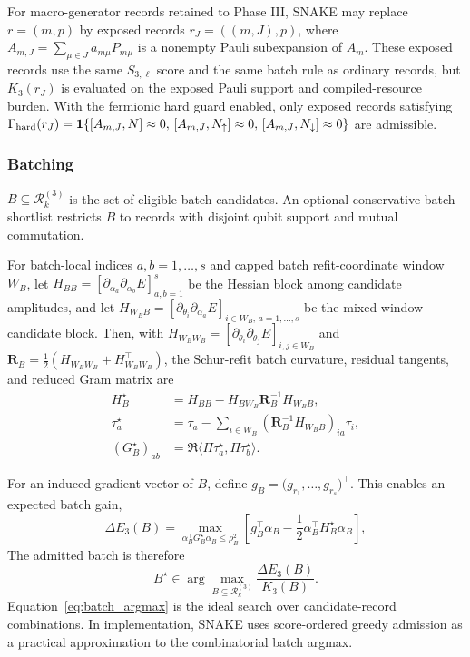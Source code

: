 \documentclass[
  reprint,
  amsmath,
  amssymb,
  aps,
  pra,
  nofootinbib,
  superscriptaddress,
  floatfix
]{revtex4-2}
\begin{document}
For macro-generator records retained to Phase III, SNAKE may replace \(r=(m,p)\) by exposed records \(r_J=((m,J),p)\), where \(A_{m,J}=\sum_{\mu\in J}a_{m\mu}P_{m\mu}\) is a nonempty Pauli subexpansion of \(A_m\). These exposed records use the same \(S_{3,\ell}\) score and the same batch rule as ordinary records, but \(K_3(r_J)\) is evaluated on the exposed Pauli support and compiled-resource burden. With the fermionic hard guard enabled, only exposed records satisfying \(\Gamma_{\rm hard}(r_J)=\mathbf 1\{[A_{m,J},N]\approx0,\,[A_{m,J},N_\uparrow]\approx0,\,[A_{m,J},N_\downarrow]\approx0\}\) are admissible.

\subsubsection{Batching}

$B\subseteq\mathcal R_k^{(3)}$ is the set of eligible batch candidates.  An optional conservative batch shortlist restricts \(B\) to records with disjoint qubit support and mutual commutation.

For batch-local indices \(a,b=1,\ldots,s\) and capped batch refit-coordinate window \(W_B\), let $H_{BB}=[\partial_{\alpha_a}\partial_{\alpha_b}E]_{a,b=1}^s$ be the Hessian block among candidate amplitudes, and let $H_{W_BB}=[\partial_{\theta_i}\partial_{\alpha_a}E]_{i\in W_B,\,a=1,\ldots,s}$ be the mixed window-candidate block. Then, with $H_{W_BW_B}=[\partial_{\theta_i}\partial_{\theta_j}E]_{i,j\in W_B}$ and $\mathbf R_B=\frac12(H_{W_BW_B}+H_{W_BW_B}^{\top})$, the Schur-refit batch curvature, residual tangents, and reduced Gram matrix are
\begin{equation}
\begin{aligned}
H_B^\star
&=
H_{BB}
-
H_{BW_B}\mathbf R_B^{-1}H_{W_BB},\\
\tau_a^\star
&=\tau_a-\sum_{i\in W_B}(\mathbf R_B^{-1}H_{W_BB})_{ia}\tau_i,\\
(G_B^\star)_{ab}
&=\Re\langle \Pi\tau_a^\star,\Pi\tau_b^\star\rangle .
\end{aligned}
\label{eq:batch_schur_curvature}
\end{equation}

For an induced gradient vector of $B$, define \(g_B=\big(g_{r_1},\ldots,g_{r_s}\big)^\top\). This enables an expected batch gain,
\begin{equation}
\Delta E_3(B)
=
\max_{\alpha_B^\top G_B^\star\alpha_B\le \rho_B^2}
\left[
g_B^\top\alpha_B
-
\frac12\alpha_B^\top H_B^\star\alpha_B
\right],
\label{eq:batch_expected_gain}
\end{equation}
The admitted batch is therefore
\begin{equation}
B^\star\in\arg\max_{B\subseteq\mathcal R_k^{(3)}}\frac{\Delta E_3(B)}{K_3(B)}.
\label{eq:batch_argmax}
\end{equation}
Equation~\eqref{eq:batch_argmax} is the ideal search over candidate-record
combinations. In implementation, SNAKE uses score-ordered greedy admission as a
practical approximation to the combinatorial batch argmax.
\end{document}
